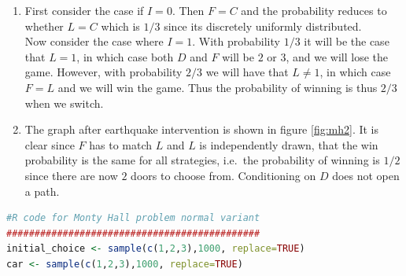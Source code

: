 \begin{enumerate}
\begin{gradedsolution}
\begin{enumerate}
    We see that $L$ has a discrete uniform distributions on its domain. We define the Markov kernel $P(D|\doit(C, L))$ by two cases 
    \begin{itemize}
      \item If $c=l$ then it is the uniform distribution on $\{1,2,3\} \setminus \{c\}$. 
      \item If $c \neq l$, then $P(D=d|\doit(C=c, L=l)) = 1 - \delta_{\{c,l\}}(d)$.
    \end{itemize} 
    Similarly for the Markov kernel $P(F|\doit(I, C, D))$ we distinguish cases:
    \begin{itemize}
      \item If $I=0$, then $P(F=f|\doit(I=0, C=c, D=d)) = \delta_{\{c\}}(f)$.
      \item If $I=1$, then by the generative process we only have to concern ourselves with the case where $c \neq d$, in which case $P(F=f|\doit(I=0, C=c, D=d)) = 1 - \delta_{\{c,d\}}(f)$. If $c = d$ we may define the Markov kernel as some arbitrary distribution over $F$.
    \end{itemize}  
    Finally, $P(O \given \doit(F, L))$ is defined by the probability mass function $P(O=1 \given \doit(F=f, L=l)) = \delta_{\{l\}}(f)$.

    \item First consider the case if $I=0$. Then $F=C$ and the probability reduces to whether $L=C$ which is $1/3$ since its discretely uniformly distributed.\\
    
    Now consider the case where $I=1$. With probability $1/3$ it will be the case that $L=1$, in which case both $D$ and $F$ will be $2$ or $3$, and we will lose the game. However, with probability $2/3$ we will have that $L\neq 1$, in which case $F=L$ and we will win the game. Thus the probability of winning is thus $2/3$ when we switch.

    \item The graph after earthquake intervention is shown in figure \ref{fig:mh2}. It is clear since $F$ has to match $L$ and $L$ is independently drawn, that the win probability is the same for all strategies, i.e.\ the probability of winning is $1/2$ since there are now $2$ doors to choose from. Conditioning on $D$ does not open a path.
  \end{enumerate}
\end{gradedsolution}

\begin{lstlisting}[language=R]
#R code for Monty Hall problem normal variant
#############################################
initial_choice <- sample(c(1,2,3),1000, replace=TRUE)
car <- sample(c(1,2,3),1000, replace=TRUE)


\end{lstlisting}
\end{enumerate}
